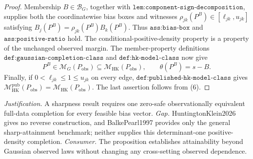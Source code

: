 \documentclass{article}
\begin{document}
\begin{proof}
Membership \(B\in\mathcal B_G\), together with \(\texttt{lem:component-sign-decomposition}\), supplies both the coordinatewise bias boxes and witnesses \(\rho_{jk}(P^B)\in[\ell_{jk},u_{jk}]\) satisfying \(B_j(P^B)=\rho_{jk}(P^B)B_k(P^B)\).  Thus \(\texttt{ass:bias-box}\) and \(\texttt{ass:positive-ratio}\) hold.  The conditional-positive-density property is a property of the unchanged observed margin.  The member-property definitions \(\texttt{def:gaussian-completion-class}\) and \(\texttt{def:hk-model-class}\) now give
\[
P^B\in\mathcal M_G(P_{\mathrm{obs}})
\subseteq\mathcal M_{\mathrm{HK}}(P_{\mathrm{obs}}),
\qquad \theta(P^B)=s-B. \tag{6}
\]
Finally, if \(0<\ell_{jk}\le1\le u_{jk}\) on every edge, \(\texttt{def:published-hk-model-class}\) gives \(\mathcal M_{\mathrm{HK}}^{\mathrm{pub}}(P_{\mathrm{obs}})=\mathcal M_{\mathrm{HK}}(P_{\mathrm{obs}})\).  The last assertion follows from (6).
\end{proof}
\par\smallskip\noindent \textit{Justification.} A sharpness result requires one zero-safe observationally equivalent full-data completion for every feasible bias vector. \textit{Gap.} HuntingtonKlein2026 gives no reverse construction, and BalkePearl1997 provides only the general sharp-attainment benchmark; neither supplies this determinant-one positive-density completion. \textit{Consumer.} The proposition establishes attainability beyond Gaussian observed laws without changing any cross-setting observed dependence.
\end{document}
